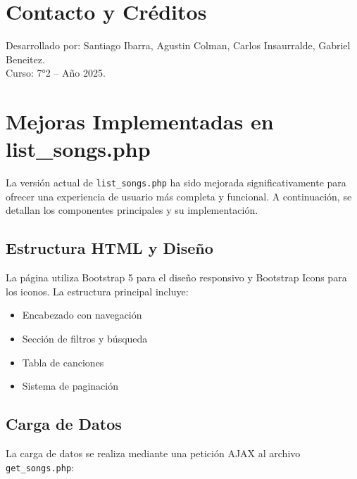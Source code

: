 \documentclass[a4paper,12pt]{article}
\begin{document}
\section{Contacto y Créditos}
Desarrollado por: Santiago Ibarra, Agustin Colman, Carlos Insaurralde, Gabriel Beneitez.\\
Curso: 7°2 -- Año 2025.

\section{Mejoras Implementadas en list\_songs.php}
La versión actual de \texttt{list\_songs.php} ha sido mejorada significativamente para ofrecer una experiencia de usuario más completa y funcional. A continuación, se detallan los componentes principales y su implementación.

\subsection{Estructura HTML y Diseño}
La página utiliza Bootstrap 5 para el diseño responsivo y Bootstrap Icons para los iconos. La estructura principal incluye:

\begin{itemize}
    \item Encabezado con navegación
    \item Sección de filtros y búsqueda
    \item Tabla de canciones
    \item Sistema de paginación
\end{itemize}

\subsection{Carga de Datos}
La carga de datos se realiza mediante una petición AJAX al archivo \texttt{get\_songs.php}:
\end{document}

